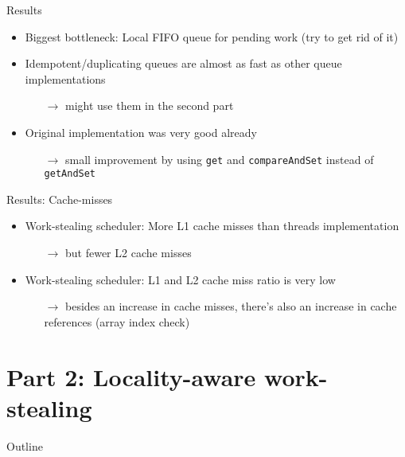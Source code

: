 \begin{frame}{Results}
  \begin{itemize}
  \item Biggest bottleneck: Local FIFO queue for pending work (try to
    get rid of it)
  \item Idempotent/duplicating queues are almost as fast as other
    queue implementations
    \begin{itemize}
    \item[$\rightarrow$] might use them in the second part
    \end{itemize}
  \item Original implementation was very good already
    \begin{itemize}
    \item[$\rightarrow$] small improvement by using \lstinline!get!
      and \lstinline!compareAndSet! instead of \lstinline!getAndSet!
    \end{itemize}
  \end{itemize}
\end{frame}

\begin{frame}{Results: Cache-misses}
  \begin{itemize}
  \item Work-stealing scheduler: More L1 cache misses than threads
    implementation
    \begin{itemize}
    \item[$\rightarrow$] but fewer L2 cache misses
    \end{itemize}
  \item Work-stealing scheduler: L1 and L2 cache miss ratio is very
    low
    \begin{itemize}
    \item[$\rightarrow$] besides an increase in cache misses, there's
      also an increase in cache references (array index check)
    \end{itemize}
  \end{itemize}  
\end{frame}


\section{Part 2: Locality-aware work-stealing}

\begin{frame}{Outline}
  \tableofcontents[current]
\end{frame}

